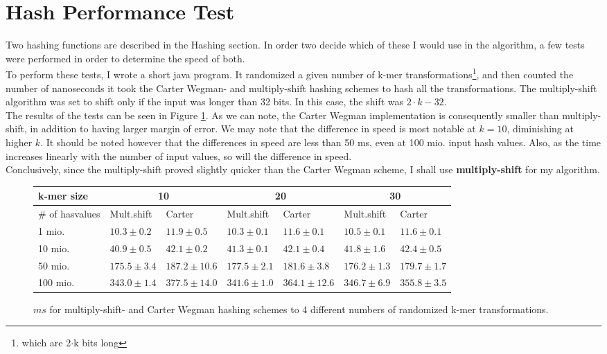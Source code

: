 \documentclass[../../main.tex]{subfiles}
\begin{document}
\section{Hash Performance Test}

Two hashing functions are described in the Hashing section. In order two decide which of these I would use in the algorithm, a few tests were performed in order to determine the speed of both.\\

To perform these tests, I wrote a short java program. It randomized a given number of k-mer transformations\footnote{which are 2$\cdot$k bits long}, and then counted the number of nanoseconds it took the Carter Wegman- and multiply-shift hashing schemes to hash all the transformations. The multiply-shift algorithm was set to shift only if the input was longer than 32 bits. In this case, the shift was $2\cdot k - 32$.\\

The results of the tests can be seen in Figure \ref{fig:hashTest}. As we can note, the Carter Wegman implementation is consequently smaller than multiply-shift, in addition to having larger margin of error. We may note that the difference in speed is most notable at $k=10$, diminishing at higher $k$. It should be noted however that the differences in speed are less than 50 ms, even at 100 mio. input hash values. Also, as the time increases linearly with the number of input values, so will the difference in speed.\\

Conclusively, since the multiply-shift proved slightly quicker than the Carter Wegman scheme, I shall use {\bf multiply-shift} for my algorithm.
\begin{figure}[h]
\begin{tabular}{| l | l | l | l | l | l | l |}
\hline
k-mer size & \multicolumn{2}{c|}{10} & \multicolumn{2}{c|}{20} & \multicolumn{2}{c|}{30} \\
\hline
\# of hasvalues & Mult.shift & Carter & Mult.shift & Carter & Mult.shift & Carter \\
 \hline
1 mio. & $10.3\pm 0.2$ & $11.9\pm 0.5$ & $10.3\pm 0.1$ & $11.6\pm 0.1$ & $10.5\pm 0.1$ & $11.6\pm 0.1$\\
10 mio. & $40.9\pm 0.5$ & $42.1\pm0.2$ & $41.3\pm 0.1$ & $42.1\pm0.4$ & $41.8\pm 1.6$ & $42.4\pm0.5$\\
50 mio. & $175.5\pm3.4$ & $187.2\pm 10.6$ & $177.5\pm2.1$  & $181.6\pm3.8$ & $176.2\pm1.3$ & $179.7\pm1.7$\\
100 mio. & $343.0\pm1.4$ & $377.5\pm14.0$ & $341.6\pm1.0$ & $364.1\pm12.6$ & $346.7\pm6.9$ & $355.8\pm3.5$\\
\hline
\end{tabular}
\caption{$ms$ for multiply-shift- and Carter Wegman hashing schemes to 4 different numbers of randomized k-mer transformations.}
\label{fig:hashTest}
\end{figure}
\end{document}
